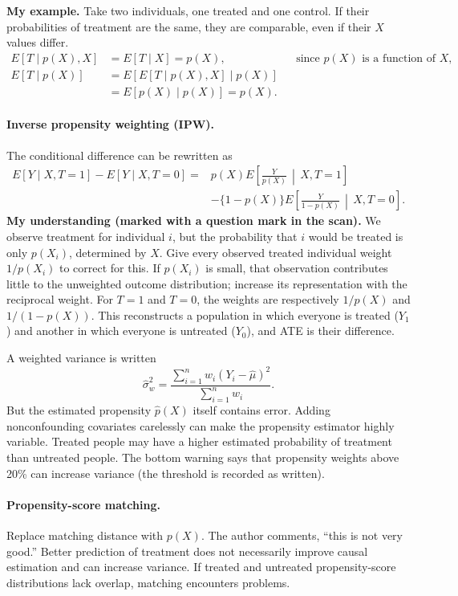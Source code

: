 \textbf{My example.} Take two individuals, one treated and one control. If their probabilities of treatment are the same, they are comparable, even if their $X$ values differ.
\begin{align*}
E[T\mid p(X),X]&=E[T\mid X]=p(X), &&\text{since }p(X)\text{ is a function of }X,\\
E[T\mid p(X)]&=E[E[T\mid p(X),X]\mid p(X)]\\
&=E[p(X)\mid p(X)]=p(X).
\end{align*}

\paragraph{Inverse propensity weighting (IPW).}
The conditional difference can be rewritten as
\begin{align*}
E[Y\mid X,T=1]-E[Y\mid X,T=0]
={}&p(X)E\!\left[\frac{Y}{p(X)}\,\middle|\,X,T=1\right]\\
&-\{1-p(X)\}E\!\left[\frac{Y}{1-p(X)}\,\middle|\,X,T=0\right].
\end{align*}
\textbf{My understanding (marked with a question mark in the scan).} We observe treatment for individual $i$, but the probability that $i$ would be treated is only $p(X_i)$, determined by $X$. Give every observed treated individual weight $1/p(X_i)$ to correct for this. If $p(X_i)$ is small, that observation contributes little to the unweighted outcome distribution; increase its representation with the reciprocal weight. For $T=1$ and $T=0$, the weights are respectively $1/p(X)$ and $1/(1-p(X))$. This reconstructs a population in which everyone is treated ($Y_1$) and another in which everyone is untreated ($Y_0$), and ATE is their difference.

A weighted variance is written
\[\hat\sigma_w^2=\frac{\sum_{i=1}^n w_i(Y_i-\hat\mu)^2}{\sum_{i=1}^n w_i}.\]
But the estimated propensity $\hat p(X)$ itself contains error. Adding nonconfounding covariates carelessly can make the propensity estimator highly variable. Treated people may have a higher estimated probability of treatment than untreated people. The bottom warning says that propensity weights above 20\% can increase variance (the threshold is recorded as written).

\paragraph{Propensity-score matching.}
Replace matching distance with $p(X)$. The author comments, ``this is not very good.'' Better prediction of treatment does not necessarily improve causal estimation and can increase variance. If treated and untreated propensity-score distributions lack overlap, matching encounters problems.

